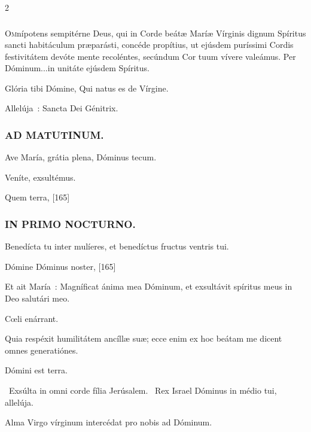 \documentclass[9pt,twoside]{extarticle}
\begin{document}
\begin{multicols}{2}
{\subsubsection*{\center {}}
\lettrine{O}mnípotens sempitérne Deus, qui in Corde beátæ Maríæ Vírginis dignum Spíritus sancti habitáculum præparásti, concéde propítius, ut ejúsdem puríssimi Cordis festivitátem devóte mente recoléntes, secúndum Cor tuum vívere valeámus. Per Dóminum...in unitáte ejúsdem Spíritus.

\begin{tightlist}{}
\item {}
\item {} Glória tibi Dómine, Qui natus es de Vírgine.
\item {} Allelúja~: Sancta Dei Génitrix.
\end{tightlist}

\subsubsection*{\center \textsc{AD MATUTINUM.}}
\begin{tightlist}{}
\item {} Ave María, grátia plena, \textred{*} Dóminus tecum.
\item {} Veníte, exsultémus.
\item {} Quem terra,  [165]
\end{tightlist}

\subsubsection*{\center \textsc{IN PRIMO NOCTURNO.}}
\begin{tightlist}{}
\item {} Benedícta tu inter mulíeres, et benedíctus fructus ventris tui.
\item {} Dómine Dóminus noster,  [165]
\item {} Et ait María~: Magníficat ánima mea Dóminum, et exsultávit spíritus meus in Deo salutári meo.
\item {} Cœli enárrant.
\item {} Quia respéxit humilitátem ancíllæ suæ; ecce enim ex hoc beátam me dicent omnes generatiónes.
\item {} Dómini est terra.
\item {}~Exsúlta in omni corde fília Jerúsalem. ~Rex Israel Dóminus in médio tui, allelúja.
\item {} Alma Virgo vírginum intercédat pro nobis ad Dóminum.
\end{tightlist}

}
\end{multicols}
\end{document}
